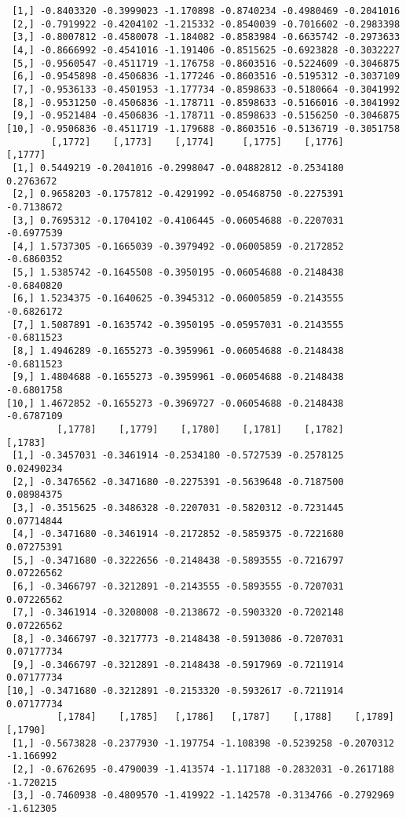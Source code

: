 \documentclass[
  letterpaper,
  DIV=11,
  numbers=noendperiod]{scrreprt}
\begin{document}
\begin{verbatim}
 [1,] -0.8403320 -0.3999023 -1.170898 -0.8740234 -0.4980469 -0.2041016
 [2,] -0.7919922 -0.4204102 -1.215332 -0.8540039 -0.7016602 -0.2983398
 [3,] -0.8007812 -0.4580078 -1.184082 -0.8583984 -0.6635742 -0.2973633
 [4,] -0.8666992 -0.4541016 -1.191406 -0.8515625 -0.6923828 -0.3032227
 [5,] -0.9560547 -0.4511719 -1.176758 -0.8603516 -0.5224609 -0.3046875
 [6,] -0.9545898 -0.4506836 -1.177246 -0.8603516 -0.5195312 -0.3037109
 [7,] -0.9536133 -0.4501953 -1.177734 -0.8598633 -0.5180664 -0.3041992
 [8,] -0.9531250 -0.4506836 -1.178711 -0.8598633 -0.5166016 -0.3041992
 [9,] -0.9521484 -0.4506836 -1.178711 -0.8598633 -0.5156250 -0.3046875
[10,] -0.9506836 -0.4511719 -1.179688 -0.8603516 -0.5136719 -0.3051758
        [,1772]    [,1773]    [,1774]     [,1775]    [,1776]    [,1777]
 [1,] 0.5449219 -0.2041016 -0.2998047 -0.04882812 -0.2534180  0.2763672
 [2,] 0.9658203 -0.1757812 -0.4291992 -0.05468750 -0.2275391 -0.7138672
 [3,] 0.7695312 -0.1704102 -0.4106445 -0.06054688 -0.2207031 -0.6977539
 [4,] 1.5737305 -0.1665039 -0.3979492 -0.06005859 -0.2172852 -0.6860352
 [5,] 1.5385742 -0.1645508 -0.3950195 -0.06054688 -0.2148438 -0.6840820
 [6,] 1.5234375 -0.1640625 -0.3945312 -0.06005859 -0.2143555 -0.6826172
 [7,] 1.5087891 -0.1635742 -0.3950195 -0.05957031 -0.2143555 -0.6811523
 [8,] 1.4946289 -0.1655273 -0.3959961 -0.06054688 -0.2148438 -0.6811523
 [9,] 1.4804688 -0.1655273 -0.3959961 -0.06054688 -0.2148438 -0.6801758
[10,] 1.4672852 -0.1655273 -0.3969727 -0.06054688 -0.2148438 -0.6787109
         [,1778]    [,1779]    [,1780]    [,1781]    [,1782]    [,1783]
 [1,] -0.3457031 -0.3461914 -0.2534180 -0.5727539 -0.2578125 0.02490234
 [2,] -0.3476562 -0.3471680 -0.2275391 -0.5639648 -0.7187500 0.08984375
 [3,] -0.3515625 -0.3486328 -0.2207031 -0.5820312 -0.7231445 0.07714844
 [4,] -0.3471680 -0.3461914 -0.2172852 -0.5859375 -0.7221680 0.07275391
 [5,] -0.3471680 -0.3222656 -0.2148438 -0.5893555 -0.7216797 0.07226562
 [6,] -0.3466797 -0.3212891 -0.2143555 -0.5893555 -0.7207031 0.07226562
 [7,] -0.3461914 -0.3208008 -0.2138672 -0.5903320 -0.7202148 0.07226562
 [8,] -0.3466797 -0.3217773 -0.2148438 -0.5913086 -0.7207031 0.07177734
 [9,] -0.3466797 -0.3212891 -0.2148438 -0.5917969 -0.7211914 0.07177734
[10,] -0.3471680 -0.3212891 -0.2153320 -0.5932617 -0.7211914 0.07177734
         [,1784]    [,1785]   [,1786]   [,1787]    [,1788]    [,1789]   [,1790]
 [1,] -0.5673828 -0.2377930 -1.197754 -1.108398 -0.5239258 -0.2070312 -1.166992
 [2,] -0.6762695 -0.4790039 -1.413574 -1.117188 -0.2832031 -0.2617188 -1.720215
 [3,] -0.7460938 -0.4809570 -1.419922 -1.142578 -0.3134766 -0.2792969 -1.612305

\end{verbatim}
\end{document}
